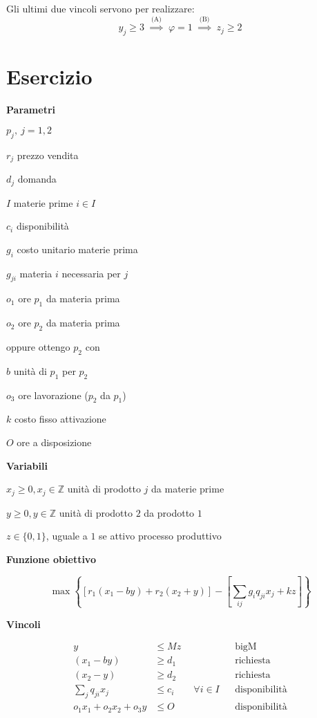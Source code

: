 \documentclass[10pt,a4paper,twoside,openright]{book}
\newcounter{es}
\newcommand{\Es}{
	\stepcounter{es}
	\section{Esercizio \arabic{es}}
	}
\newcommand{\Par}{\textbf{Parametri}}
\newcommand{\Var}{\textbf{Variabili}}
\newcommand{\Fob}{\textbf{Funzione obiettivo}}
\newcommand{\Vin}{\textbf{Vincoli}}
\begin{document}
Gli ultimi due vincoli servono per realizzare:
\begin{equation*}
	y_{j} \geq 3\ \ \overset{\text{(A)}}{\Rightarrow } \ \ \varphi =1\ \ \overset{\text{(B)}}{\Rightarrow } \ \ z_{j} \geq 2
\end{equation*}

\Es

\Par

$p_{j} ,\ j=1,2$

$r_{j}$ prezzo vendita

$d_{j}$ domanda

$I$ materie prime $i\in I$

$c_{i}$ disponibilità

$g_{i}$ costo unitario materie prima

$g_{ji}$ materia $i$ necessaria per $j$

$o_{1}$ ore $p_{1}$ da materia prima

$o_{2}$ ore $p_{2}$ da materia prima

oppure ottengo $p_{2}$ con

$b$ unità di $p_{1}$ per $p_{2}$

$o_{3}$ ore lavorazione ($p_{2}$ da $p_{1}$)

$k$ costo fisso attivazione

$O$ ore a disposizione

\Var

$x_{j} \geq 0,x_{j} \in \mathbb{Z}$ unità di prodotto $j$ da materie prime

$y\geq 0,y\in \mathbb{Z}$ unità di prodotto $2$ da prodotto $1$

$z\in \{0,1\}$, uguale a $1$ se attivo processo produttivo

\Fob

\begin{equation*}
	\max\left\{[ r_{1}( x_{1} -by) +r_{2}( x_{2} +y)] -\left[\sum _{ij} g_{i} q_{ji} x_{j} +kz\right]\right\}
\end{equation*}

\Vin

\begin{align*}
	y&\leq Mz && \text{bigM}\\
	( x_{1} -by) &\geq d_{1} && \text{richiesta}\\
	( x_{2} -y) &\geq d_{2} && \text{richiesta}\\
	\sum _{j} q_{ji} x_{j} &\leq c_{i} \qquad\forall i\in I && \text{disponibilità}\\
	o_{1} x_{1} +o_{2} x_{2} +o_{3} y&\leq O && \text{disponibilità}\\
\end{align*}
\end{document}
